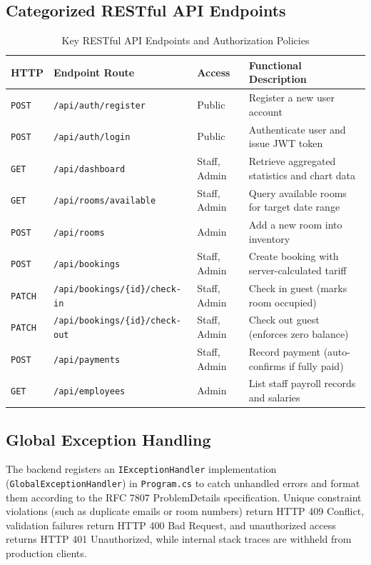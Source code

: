 \documentclass[11pt,a4paper]{article}
\begin{document}
\subsection{Categorized RESTful API Endpoints}
\begin{table}[H]
\centering
\caption{Key RESTful API Endpoints and Authorization Policies}
\label{tab:api_endpoints}
\begin{tabularx}{\textwidth}{l l l X}
\toprule
\textbf{HTTP} & \textbf{Endpoint Route} & \textbf{Access} & \textbf{Functional Description} \\
\midrule
\texttt{POST} & \texttt{/api/auth/register} & Public & Register a new user account \\
\texttt{POST} & \texttt{/api/auth/login} & Public & Authenticate user and issue JWT token \\
\texttt{GET} & \texttt{/api/dashboard} & Staff, Admin & Retrieve aggregated statistics and chart data \\
\texttt{GET} & \texttt{/api/rooms/available} & Staff, Admin & Query available rooms for target date range \\
\texttt{POST} & \texttt{/api/rooms} & Admin & Add a new room into inventory \\
\texttt{POST} & \texttt{/api/bookings} & Staff, Admin & Create booking with server-calculated tariff \\
\texttt{PATCH} & \texttt{/api/bookings/\{id\}/check-in} & Staff, Admin & Check in guest (marks room occupied) \\
\texttt{PATCH} & \texttt{/api/bookings/\{id\}/check-out} & Staff, Admin & Check out guest (enforces zero balance) \\
\texttt{POST} & \texttt{/api/payments} & Staff, Admin & Record payment (auto-confirms if fully paid) \\
\texttt{GET} & \texttt{/api/employees} & Admin & List staff payroll records and salaries \\
\bottomrule
\end{tabularx}
\end{table}

\subsection{Global Exception Handling}
The backend registers an \texttt{IExceptionHandler} implementation (\texttt{GlobalExceptionHandler}) in \texttt{Program.cs} to catch unhandled errors and format them according to the RFC 7807 ProblemDetails specification. Unique constraint violations (such as duplicate emails or room numbers) return HTTP 409 Conflict, validation failures return HTTP 400 Bad Request, and unauthorized access returns HTTP 401 Unauthorized, while internal stack traces are withheld from production clients.
\end{document}
